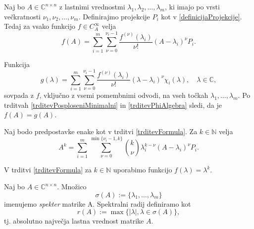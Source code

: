\documentclass[mat1]{fmfdelo}
\newcommand{\N}{\mathbb N}
\newcommand{\C}{\mathbb C}
\begin{document}
\begin{trditev} \label{trditevFormula}
    Naj bo $A \in \C^{n \times n}$ z lastnimi vrednostmi $\lambda_1, \lambda_2, \ldots, \lambda_m$, ki imajo po vrsti večkratnosti $\nu_1, \nu_2, \ldots, \nu_m$. Definirajmo projekcije $P_i$ kot v \eqref{definicijaProjekcije}. Tedaj za vsako funkcijo $f \in C_A^\infty$ velja
    \begin{equation}
        f(A) = \sum_{i=1}^m \sum_{\nu = 0}^{\nu_i - 1} \frac{f^{(\nu)}(\lambda_i)}{\nu !}(A - \lambda_i)^\nu P_i.
    \end{equation}
\end{trditev}
\begin{dokaz}
    Funkcija
    \begin{equation}
        g(\lambda) = \sum_{i=1}^m \sum_{\nu = 0}^{\nu_i - 1} \frac{f^{(\nu)}(\lambda_i)}{\nu !}(\lambda - \lambda_i)^\nu \chi_i(\lambda), \quad \lambda \in \C,
    \end{equation}
    sovpada z $f$, vključno z vsemi pomembnimi odvodi, na vseh točkah $\lambda_1, \ldots, \lambda_m$.  Po trditvah \ref{trditevPosploseniMinimalni} in \ref{trditevPhiAlgebra} sledi, da je $f(A) = g(A)$.
\end{dokaz}
\begin{posledica}
    Naj bodo predpostavke enake kot v trditvi \ref{trditevFormula}. Za $k \in \N$ velja
    \begin{equation}\label{formulaMatricnePotence}
        A^k = \sum_{i=1}^m \sum_{\nu = 0}^{\min \{\nu_i - 1, k\}} {k \choose \nu} \lambda_i^{k-\nu}(A - \lambda_i)^\nu P_i.
    \end{equation}
\end{posledica}
\begin{dokaz}
    V trditvi \ref{trditevFormula} za $k \in \N$ uporabimo funkcijo $f(\lambda) = \lambda^k$.
\end{dokaz}

\begin{definicija}
    Naj bo $A \in \C^{n \times n}$. Množico
    \begin{equation}
        \sigma(A) := \{\lambda_1, \ldots, \lambda_m\}
    \end{equation}
    imenujemo \emph{spekter} matrike A. {Spektralni radij} definiramo kot
    \begin{equation}
        r(A) := \max \{|\lambda|, \lambda \in \sigma(A)\},
    \end{equation}
    tj. absolutno največja lastna vrednost matrike $A$.
\end{definicija}
\end{document}
